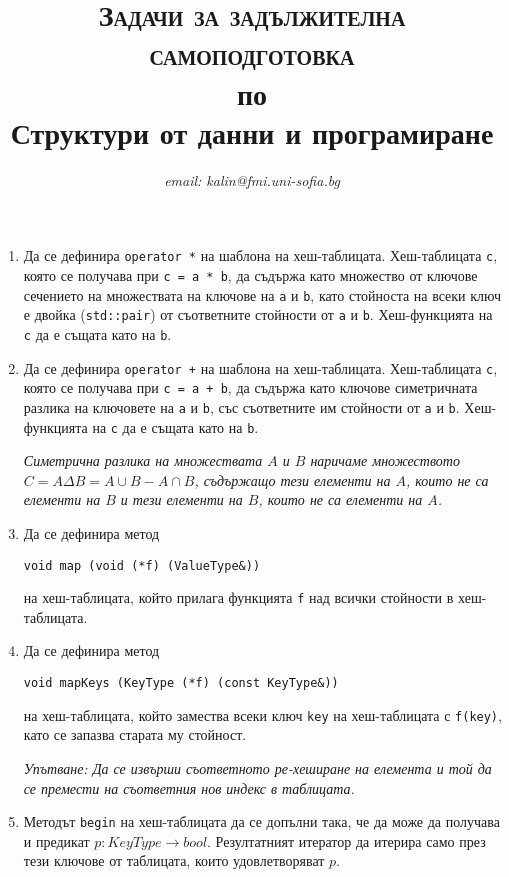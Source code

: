 \documentclass[12pt,a4paper]{article}
\author{\textit{email: kalin@fmi.uni-sofia.bg}}
\title{\textsc{Задачи за задължителна самоподготовка} \\
по \\
Структури от данни и програмиране}
\begin{document}
\maketitle


\begin{enumerate}

	\item Да се дефинира \texttt{operator *} на шаблона на хеш-таблицата. Хеш-таблицата \texttt{c}, която се получава при \texttt{c = a * b}, да съдържа като множество от ключове сечението на множествата на ключове на \texttt{a} и \texttt{b}, като стойноста на всеки ключ е двойка (\texttt{std::pair}) от съответните стойности от \texttt{a} и \texttt{b}. Хеш-функцията на \texttt{c} да е същата като на \texttt{b}.

	\item Да се дефинира \texttt{operator +} на шаблона на хеш-таблицата. Хеш-таблицата \texttt{c}, която се получава при \texttt{c = a + b}, да съдържа като ключове симетричната разлика на ключовете на \texttt{a} и \texttt{b}, със съответните им стойности от \texttt{a} и \texttt{b}. Хеш-функцията на \texttt{c} да е същата като на \texttt{b}.

	\emph{Симетрична разлика на множествата $A$ и $B$ наричаме множеството $C = A \Delta B = A \cup B - A \cap B$, съдържащо тези елементи на $A$, които не са елементи на $B$ и тези елементи на $B$, които не са елементи на $A$.}

	\item Да се дефинира метод 

	\texttt{void map (void (*f) (ValueType\&))} 

	на хеш-таблицата, който прилага функцията \texttt{f} над всички стойности в хеш-таблицата.

	\item Да се дефинира метод 

	\texttt{void mapKeys (KeyType (*f) (const KeyType\&))} 

	на хеш-таблицата, който замества всеки ключ \texttt{key} на хеш-таблицата с \texttt{f(key)}, като се запазва старата му стойност. 

	\emph{Упътване: Да се извърши съответното ре-хеширане на елемента и той да се премести на съответния нов индекс в таблицата.}


	\item Методът \texttt{begin} на хеш-таблицата да се допълни така, че да може да получава и предикат $p:KeyType \rightarrow bool$. Резултатният итератор да итерира само през тези ключове от таблицата, които удовлетворяват $p$.


\end{enumerate}
\end{document}
